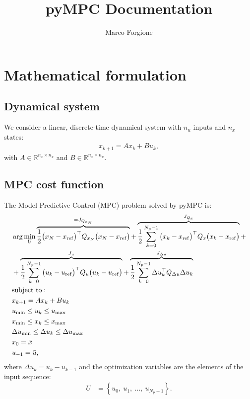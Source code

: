 \documentclass[a4paper,12pt,fleqn]{article}
\newcommand{\nin}{n_u}
\newcommand{\nx}{n_x}
\newcommand{\varu}{{U}}
\newcommand{\QxN}{Q_{x_N}}
\newcommand{\Qx}{Q_{x}}
\newcommand{\Qu}{Q_{u}}
\newcommand{\Qdu}{Q_{\Delta u}}
\newcommand{\Np}{{N_p}}
\begin{document}
 \title{pyMPC Documentation}
\author{Marco Forgione}

\maketitle

\section{Mathematical formulation}

\subsection{Dynamical system}
We consider a linear, discrete-time dynamical system with $\nin$ inputs and $\nx$ states:
\begin{align}
 x_{k+1} = A x_{k} + B u_{k},
\end{align}
with $A \in \mathbb{R}^{\nx \times \nx}$ and $B \in \mathbb{R}^{\nx \times \nin}$.

\subsection{MPC cost function}
The Model Predictive Control (MPC) problem solved by pyMPC is:
\begin{subequations}
\label{eq:MPC}
\begin{align}
  &\arg \min_{\varu} 
  \overbrace{\frac{1}{2}\big(x_N - x_{\rm ref}\big)^\top \QxN \big(x_N - x_{\rm ref}\big)}^{=J_{Q_{x_N}}} + 
  \overbrace{\frac{1}{2}\sum_{k=0}^{\Np-1} \big(x_k - x_{\rm ref}\big)^\top \Qx\big(x_k - x_{\rm ref}\big)}^{J_{Q_x}}+ \nonumber \\
  &  + 
    \overbrace{\frac{1}{2}\sum_{k=0}^{\Np-1} \big(u_k - u_{\rm ref}\big)^\top \Qu \big(u_k - u_{\rm ref}\big)}^{J_u}
    +  
  \overbrace{\frac{1}{2}\sum_{k=0}^{\Np-1} \Delta u_k^\top \Qdu \Delta u_k}^{J_{\Delta u}} \\ \nonumber
  &\text{subject to}: \nonumber\\
  &x_{k+1} = Ax_k + B u_k \label{eq:linear_dynamics} \\ 
  &u_{\rm min} \leq u_k \leq u_{\rm max}\\
  &x_{\rm min} \leq x_k \leq x_{\rm max}\\
  &\Delta u_{\rm min} \leq \Delta u_k \leq \Delta u_{\rm max}\\
  &x_0 = \bar x\\
  &u_{-1} = \bar u,
\end{align}
\end{subequations} where $\Delta u_k = u_k - u_{k-1}$ and the optimization variables are the elements of the input sequence:
\begin{align}
  \varu & = \left\{ u_0,\ u_1,\ \dots, \ u_{\Np-1} \right \}.
\end{align}
\end{document}
